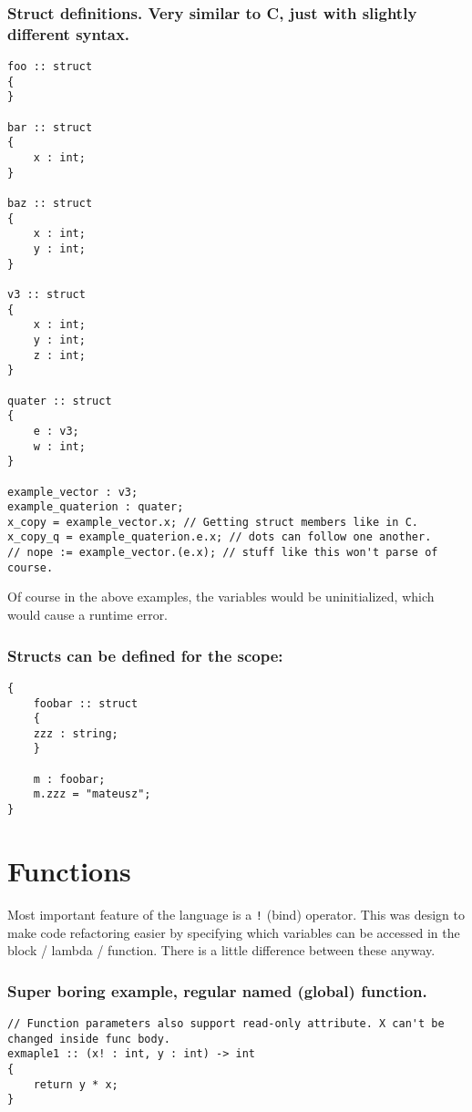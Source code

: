 \documentclass[11pt]{article}
\begin{document}
\subsubsection*{Struct definitions. Very similar to C, just with slightly different syntax.}
\label{sec:orgaa77729}
\begin{verbatim}
foo :: struct
{
}

bar :: struct
{
    x : int;
}

baz :: struct
{
    x : int;
    y : int;
}

v3 :: struct
{
    x : int;
    y : int;
    z : int;
}

quater :: struct
{
    e : v3;
    w : int;
}

example_vector : v3;
example_quaterion : quater;
x_copy = example_vector.x; // Getting struct members like in C.
x_copy_q = example_quaterion.e.x; // dots can follow one another.
// nope := example_vector.(e.x); // stuff like this won't parse of course.

\end{verbatim}

Of course in the above examples, the variables would be uninitialized, which
would cause a runtime error.

\subsubsection*{Structs can be defined for the scope:}
\label{sec:org58f99ee}
\begin{verbatim}
{
    foobar :: struct
    {
	zzz : string;
    }

    m : foobar;
    m.zzz = "mateusz";
}
\end{verbatim}

\section*{Functions}
\label{sec:org1a0ac13}

Most important feature of the language is a \texttt{!} (bind) operator. This was design
to make code refactoring easier by specifying which variables can be accessed in
the block / lambda / function. There is a little difference between these
anyway.

\subsubsection*{Super boring example, regular named (global) function.}
\label{sec:org7295bf2}
\begin{verbatim}
// Function parameters also support read-only attribute. X can't be changed inside func body.
exmaple1 :: (x! : int, y : int) -> int
{
    return y * x;
}
\end{verbatim}
\end{document}
